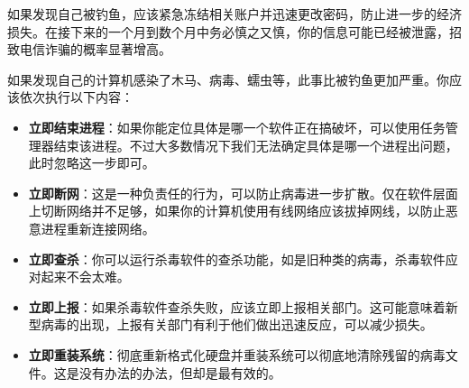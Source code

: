 \documentclass[../main.tex]{subfiles}
\begin{document}
如果发现自己被钓鱼，应该紧急冻结相关账户并迅速更改密码，防止进一步的经济损失。在接下来的一个月到数个月中务必慎之又慎，你的信息可能已经被泄露，招致电信诈骗的概率显著增高。

如果发现自己的计算机感染了木马、病毒、蠕虫等，此事比被钓鱼更加严重。你应该依次执行以下内容：

\begin{itemize}
    \item \textbf{立即结束进程}：如果你能定位具体是哪一个软件正在搞破坏，可以使用任务管理器结束该进程。不过大多数情况下我们无法确定具体是哪一个进程出问题，此时忽略这一步即可。
    \item \textbf{立即断网}：这是一种负责任的行为，可以防止病毒进一步扩散。仅在软件层面上切断网络并不足够，如果你的计算机使用有线网络应该拔掉网线，以防止恶意进程重新连接网络。
    \item \textbf{立即查杀}：你可以运行杀毒软件的查杀功能，如是旧种类的病毒，杀毒软件应对起来不会太难。
    \item \textbf{立即上报}：如果杀毒软件查杀失败，应该立即上报相关部门。这可能意味着新型病毒的出现，上报有关部门有利于他们做出迅速反应，可以减少损失。
    \item \textbf{立即重装系统}：彻底重新格式化硬盘并重装系统可以彻底地清除残留的病毒文件。这是没有办法的办法，但却是最有效的。
\end{itemize}
\end{document}
